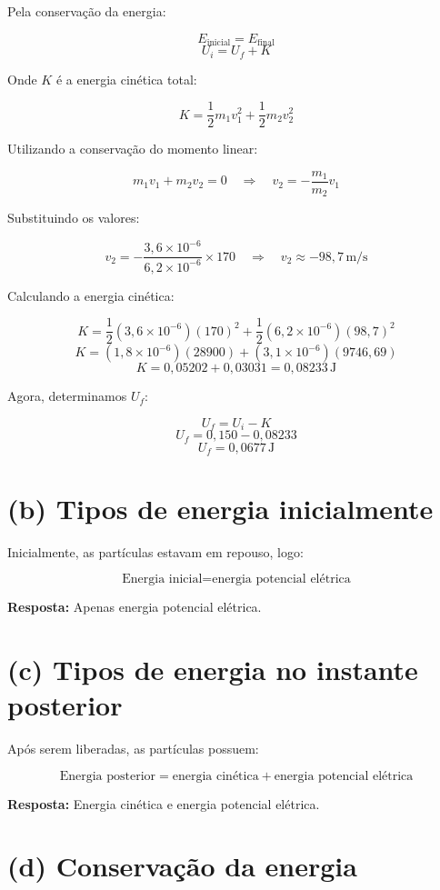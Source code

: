 \documentclass[a4paper,12pt]{article}
\begin{document}
\begin{flushleft}
Pela conservação da energia:

\[
E_{\text{inicial}} = E_{\text{final}}
\]
\[
U_i = U_f + K
\]

Onde \( K \) é a energia cinética total:

\[
K = \frac{1}{2} m_1 v_1^2 + \frac{1}{2} m_2 v_2^2
\]

Utilizando a conservação do momento linear:

\[
m_1 v_1 + m_2 v_2 = 0
\quad \Rightarrow \quad
v_2 = -\frac{m_1}{m_2} v_1
\]

Substituindo os valores:

\[
v_2 = -\frac{3{,}6 \times 10^{-6}}{6{,}2 \times 10^{-6}} \times 170
\quad \Rightarrow \quad
v_2 \approx -98{,}7 \, \text{m/s}
\]

Calculando a energia cinética:

\[
K = \frac{1}{2} (3{,}6 \times 10^{-6}) (170)^2 + \frac{1}{2} (6{,}2 \times 10^{-6}) (98{,}7)^2
\]
\[
K = (1{,}8 \times 10^{-6})(28900) + (3{,}1 \times 10^{-6})(9746{,}69)
\]
\[
K = 0{,}05202 + 0{,}03031 = 0{,}08233 \, \text{J}
\]

Agora, determinamos \( U_f \):

\[
U_f = U_i - K
\]
\[
U_f = 0{,}150 - 0{,}08233
\]
\[
\boxed{U_f = 0{,}0677 \, \text{J}}
\]

\section*{(b) Tipos de energia inicialmente}

Inicialmente, as partículas estavam em repouso, logo:

\[
\text{Energia inicial} = \text{energia potencial elétrica}
\]

\textbf{Resposta:} Apenas energia potencial elétrica.

\section*{(c) Tipos de energia no instante posterior}

Após serem liberadas, as partículas possuem:

\[
\text{Energia posterior} = \text{energia cinética} + \text{energia potencial elétrica}
\]

\textbf{Resposta:} Energia cinética e energia potencial elétrica.

\section*{(d) Conservação da energia}


\end{flushleft}
\end{document}
